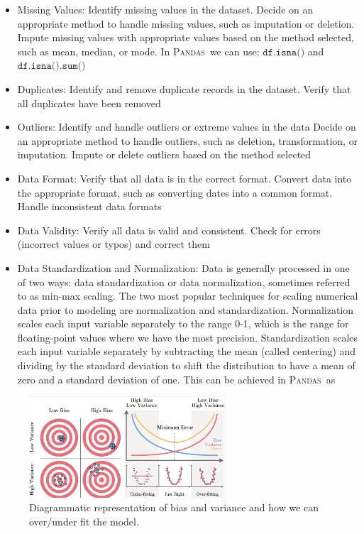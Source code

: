 \documentclass[11pt]{article}
\newcommand{\PAD}{\textsc{Pandas}}
\begin{document}
\begin{itemize}
\item Missing Values: Identify missing values in the dataset. Decide on an appropriate method to handle missing values, such as imputation or deletion. Impute missing values with appropriate values based on the method selected, such as mean, median, or mode. 
In \PAD~we can use: $\texttt{df.isna()}$ and $\texttt{df.isna().sum()}$

\begin{mdframed}[backgroundcolor=celadon!6]

\end{mdframed}



\item Duplicates: Identify and remove duplicate records in the dataset. Verify that all duplicates have been removed
\item Outliers: Identify and handle outliers or extreme values in the data Decide on an appropriate method to handle outliers, such as deletion, transformation, or imputation. Impute or delete outliers based on the method selected
\item Data Format: Verify that all data is in the correct format. Convert data into the appropriate format, such as converting dates into a common format. Handle inconsistent data formats\
\item Data Validity: Verify all data is valid and consistent. Check for errors (incorrect values or typos) and correct them
\item Data Standardization and Normalization: Data is generally processed in one of two ways:  data standardization or data normalization, sometimes referred to as min-max scaling. The two most popular techniques for scaling numerical data prior to modeling are normalization and standardization. Normalization scales each input variable separately to the range 0-1, which is the range for floating-point values where we have the most precision. Standardization scales each input variable separately by subtracting the mean (called centering) and dividing by the standard deviation to shift the distribution to have a mean of zero and a standard deviation of one. This can be achieved in \PAD~as 
\end{itemize}



\begin{figure}
\centering 
\includegraphics[width=0.65\textwidth]{cartoon1.png}
\caption{\label{fig:bias1}Diagrammatic representation of bias and variance and how we can over/under fit the model.}
\end{figure}
\end{document}
